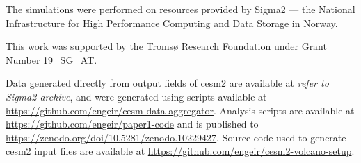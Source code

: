 \documentclass{ametsocV6.1}
\begin{document}
\clearpage
\acknowledgments{}

The simulations were performed on resources provided by Sigma2 --- the National
Infrastructure for High Performance Computing and Data Storage in Norway.

This work was supported by the Tromsø Research Foundation under Grant Number 19\_SG\_AT.

%
%
\datastatement{}

Data generated directly from output fields of \gls{cesm2} are available at \emph{refer
  to Sigma2 archive}, and were generated using scripts available at
\url{https://github.com/engeir/cesm-data-aggregator}. Analysis scripts are available at
\url{https://github.com/engeir/paper1-code} and is published to
\url{https://zenodo.org/doi/10.5281/zenodo.10229427}. Source code used to generate
\gls{cesm2} input files are available at
\url{https://github.com/engeir/cesm2-volcano-setup}.

%
\end{document}

